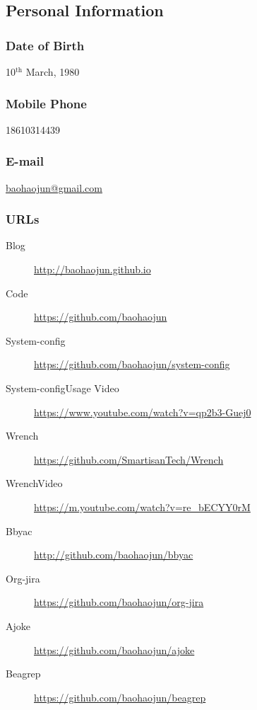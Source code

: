 \documentclass[11pt,dvipdfmx,CJKbookmarks]{article}
\begin{document}
\begin{CJK*}{UTF8}{simsun}
\section{Personal Information}
\label{sec:org9d6cd15}
\subsubsection{Date of Birth}
\label{sec:org56ba03c}
10\(^{\text{th}}\) March, 1980
\subsubsection{Mobile Phone}
\label{sec:org0c5cffe}
18610314439
\subsubsection{E-mail}
\label{sec:orgbf6115c}
\href{mailto:baohaojun@gmail.com}{baohaojun@gmail.com}
\subsubsection{URLs}
\label{sec:orge96248a}
\begin{description}
\item[{Blog}] \url{http://baohaojun.github.io}
\item[{Code}] \url{https://github.com/baohaojun}
\item[{System-config}] \url{https://github.com/baohaojun/system-config}
\item[{System-config\thinspace Usage Video}] \url{https://www.youtube.com/watch?v=qp2b3-Guej0}
\item[{Wrench}] \url{https://github.com/SmartisanTech/Wrench}
\item[{Wrench\thinspace Video}] \url{https://m.youtube.com/watch?v=re\_bECYY0rM}
\item[{Bbyac}] \url{http://github.com/baohaojun/bbyac}
\item[{Org-jira}] \url{https://github.com/baohaojun/org-jira}
\item[{Ajoke}] \url{https://github.com/baohaojun/ajoke}
\item[{Beagrep}] \url{https://github.com/baohaojun/beagrep}
\end{description}



\end{CJK*}
\end{document}
